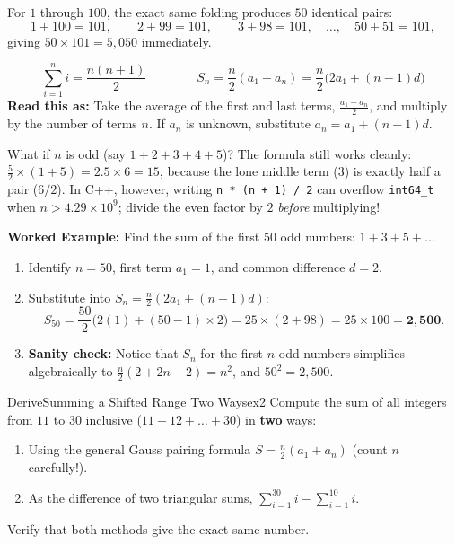 \documentclass[11pt,a4paper]{article}
\theoremstyle{definition}
\begin{document}
For $1$ through $100$, the exact same folding produces $50$ identical pairs:
\[
    1 + 100 = 101, \qquad 2 + 99 = 101, \qquad 3 + 98 = 101, \quad \dots, \quad 50 + 51 = 101,
\]
giving $50 \times 101 = 5{,}050$ immediately.

\begin{formulabox}
\[
    \sum_{i=1}^{n} i = \frac{n(n+1)}{2}
    \qquad\qquad
    S_n = \frac{n}{2}(a_1 + a_n) = \frac{n}{2}\bigl(2a_1 + (n - 1)d\bigr)
\]
\textbf{Read this as:} Take the average of the first and last terms, $\frac{a_1 + a_n}{2}$, and multiply by the number of terms $n$. If $a_n$ is unknown, substitute $a_n = a_1 + (n - 1)d$.
\end{formulabox}

\begin{watchoutbox}
What if $n$ is odd (say $1 + 2 + 3 + 4 + 5$)? The formula still works cleanly: $\frac{5}{2} \times (1 + 5) = 2.5 \times 6 = 15$, because the lone middle term ($3$) is exactly half a pair ($6/2$). In C++, however, writing \texttt{n * (n + 1) / 2} can overflow \texttt{int64\_t} when $n > 4.29 \times 10^9$; divide the even factor by $2$ \emph{before} multiplying!
\end{watchoutbox}

\textbf{Worked Example:} Find the sum of the first $50$ odd numbers: $1 + 3 + 5 + \dots$
\begin{enumerate}
    \item Identify $n = 50$, first term $a_1 = 1$, and common difference $d = 2$.
    \item Substitute into $S_n = \frac{n}{2}(2a_1 + (n - 1)d)$:
    \[
        S_{50} = \frac{50}{2}\bigl(2(1) + (50 - 1)\times 2\bigr) = 25 \times (2 + 98) = 25 \times 100 = \mathbf{2{,}500}.
    \]
    \item \textbf{Sanity check:} Notice that $S_n$ for the first $n$ odd numbers simplifies algebraically to $\frac{n}{2}(2 + 2n - 2) = n^2$, and $50^2 = 2{,}500$.
\end{enumerate}

\begin{tryitbox}{Derive}{Summing a Shifted Range Two Ways}{ex2}
Compute the sum of all integers from $11$ to $30$ inclusive ($11 + 12 + \dots + 30$) in \textbf{two} ways:
\begin{enumerate}
    \item Using the general Gauss pairing formula $S = \frac{n}{2}(a_1 + a_n)$ (count $n$ carefully!).
    \item As the difference of two triangular sums, $\sum_{i=1}^{30} i - \sum_{i=1}^{10} i$.
\end{enumerate}
Verify that both methods give the exact same number.
\end{tryitbox}
\end{document}
